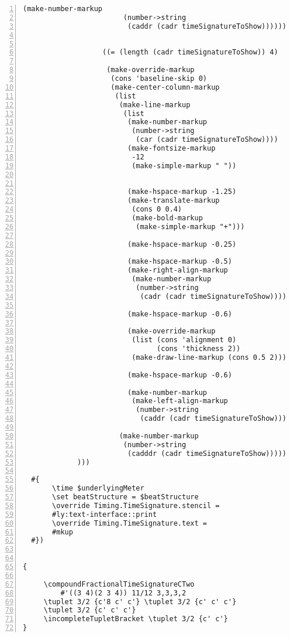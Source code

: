 \begin{Verbatim}[numbers=left,xleftmargin=5mm]
                       (make-number-markup
                        (number->string
                         (caddr (cadr timeSignatureToShow))))))))


                   ((= (length (cadr timeSignatureToShow)) 4)

                    (make-override-markup
                     (cons 'baseline-skip 0)
                     (make-center-column-markup
                      (list
                       (make-line-markup
                        (list
                         (make-number-markup
                          (number->string
                           (car (cadr timeSignatureToShow))))
                         (make-fontsize-markup
                          -12
                          (make-simple-markup " "))


                         (make-hspace-markup -1.25)
                         (make-translate-markup
                          (cons 0 0.4)
                          (make-bold-markup
                           (make-simple-markup "+")))

                         (make-hspace-markup -0.25)

                         (make-hspace-markup -0.5)
                         (make-right-align-markup
                          (make-number-markup
                           (number->string
                            (cadr (cadr timeSignatureToShow)))))

                         (make-hspace-markup -0.6)

                         (make-override-markup
                          (list (cons 'alignment 0)
                                (cons 'thickness 2))
                          (make-draw-line-markup (cons 0.5 2)))

                         (make-hspace-markup -0.6)

                         (make-number-markup
                          (make-left-align-markup
                           (number->string
                            (caddr (cadr timeSignatureToShow)))))))

                       (make-number-markup
                        (number->string
                         (cadddr (cadr timeSignatureToShow)))))))))
             )))

  #{
       \time $underlyingMeter
       \set beatStructure = $beatStructure
       \override Timing.TimeSignature.stencil =
       #ly:text-interface::print
       \override Timing.TimeSignature.text =
       #mkup
  #})


{

     \compoundFractionalTimeSignatureCTwo
     	 #'((3 4)(2 3 4)) 11/12 3,3,3,2
     \tuplet 3/2 {c'8 c' c'} \tuplet 3/2 {c' c' c'}
     \tuplet 3/2 {c' c' c'}
     \incompleteTupletBracket \tuplet 3/2 {c' c'}
}
\end{Verbatim}
